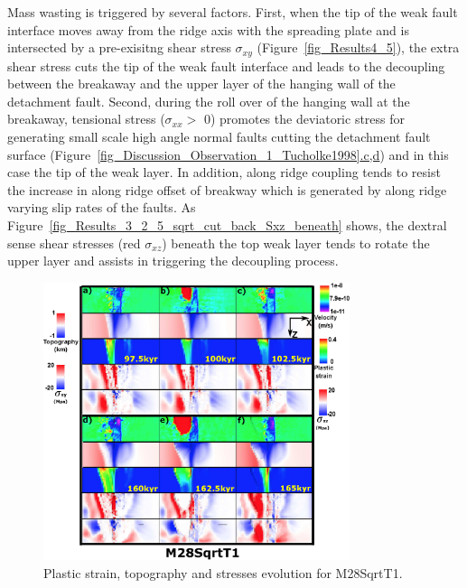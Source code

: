 Mass wasting is triggered by several factors. First, when the tip of the weak fault interface moves away from the ridge axis with the spreading plate and is intersected by a pre-exisitng shear stress $\sigma_{xy}$ (Figure~\hyperref[fig_Results4_5]{\ref{fig_Results4_5}}), the extra shear stress cuts the tip of the weak fault interface and leads to the decoupling between the breakaway and the upper layer of the hanging wall of the detachment fault. Second, during the roll over of the hanging wall at the breakaway, tensional stress ($\sigma_{xx} >$ 0) promotes the deviatoric stress for generating small scale high angle normal faults cutting the detachment fault surface \citep{Tucholke1998} (Figure~\hyperref[fig_Discussion_Observation_1_Tucholke1998]{\ref{fig_Discussion_Observation_1_Tucholke1998}.c,d}) and in this case the tip of the weak layer. In addition, along ridge coupling tends to resist the increase in along ridge offset of breakway which is generated by along ridge varying slip rates of the faults. As Figure~\hyperref[fig_Results_3_2_5_sqrt_cut_back_Sxz_beneath]{\ref{fig_Results_3_2_5_sqrt_cut_back_Sxz_beneath}} shows, the dextral sense shear stresses (red $\sigma_{xz}$) beneath the top weak layer tends to rotate the upper layer and assists in triggering the decoupling process.  

\begin{figure}[h]
  \centering
    \includegraphics[width=0.8\textwidth]{./Figures/fig_Results4_4_sqrt_cut_back_with_time_1.eps}
  \caption{Plastic strain, topography and stresses evolution for M28SqrtT1.}
 \label{fig_Results4_4}
\end{figure}  

